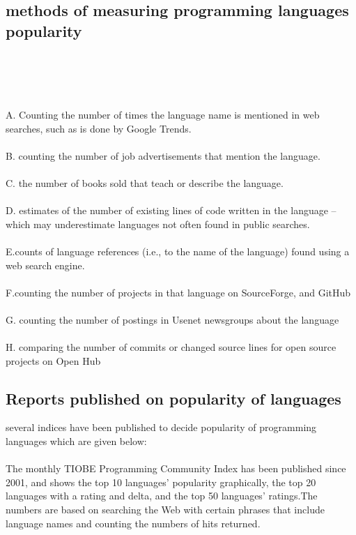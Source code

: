 \documentclass[a4paper, 12pt]{report}
\begin{document}
\section{\large{methods of measuring programming languages popularity}} \\ \\
\large{
\\ \\A. Counting the number of times the language name is mentioned in web searches, such as is done by Google Trends.
\\ \\B. counting the number of job advertisements that mention the language.
\\ \\C. the number of books sold that teach or describe the language.
\\ \\D. estimates of the number of existing lines of code written in the language – which may underestimate languages not 
often found in public searches. \\ \\E.counts of language references (i.e., to the name of the language) found using a web search engine. \\ \\ F.counting the number of projects in that language on SourceForge, and GitHub
\\ \\G. counting the number of postings in Usenet newsgroups about the language
\\ \\H. comparing the number of commits or changed source lines for open source projects on Open Hub
 }
\begin{center}
\chapter{Reports published on popularity of languages}
\end{center}
\newpageSeveral several indices have been published to decide popularity of programming languages which are given below:
\\ \\The monthly TIOBE Programming Community Index has been published since 2001, and shows the top 10 languages' 
popularity graphically, the top 20 languages with a rating and delta, and the top 50 languages' ratings.The numbers are based 
on searching the Web with certain phrases that include language names and counting the numbers of hits returned.
\end{document}

